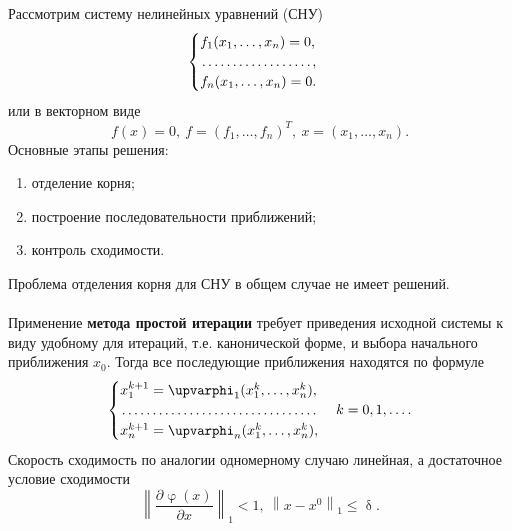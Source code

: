 \documentclass[a4paper, 12pt]{report}
\numberwithin{equation}{section}
\renewcommand{\leq}{\leqslant}
\renewcommand{\delta}{\updelta}
\renewcommand{\varphi}{\upvarphi}
\newcommand\Norm[1]{\left\| #1 \right\|}
\begin{document}
	Рассмотрим систему нелинейных уравнений (СНУ)
	\begin{equation}
		\begin{cases}
			f_1(x_1,\ldots, x_n) = 0,\\
			\dotfill,\\
			f_n(x_1,\ldots, x_n) = 0.\\
		\end{cases}
	\end{equation}
	или в векторном виде 
	\begin{equation}
		f(x) = 0,\ f=(f_1,\ldots, f_n)^T,\ x = (x_1,\ldots, x_n).
	\end{equation}
	Основные этапы решения:
	\begin{enumerate}
		\item отделение корня;
		\item построение последовательности приближений;
		\item контроль сходимости.
	\end{enumerate}
	Проблема отделения корня для СНУ в общем случае не имеет решений.
	\\\\
	Применение \textbf{метода простой итерации} требует приведения исходной системы к виду удобному для итераций, т.е. канонической форме, и выбора начального приближения $x_0$. Тогда все последующие приближения находятся по формуле 
	\begin{equation}
		\begin{cases}
			x_1^{k+1} = \varphi_1(x_1^k, \ldots, x_n^k),\\
			\dotfill\\
			x_n^{k+1} = \varphi_n(x_1^k, \ldots, x_n^k),
		\end{cases}
		k=0,1,\ldots.
	\end{equation}
	Скорость сходимость по аналогии одномерному случаю линейная, а достаточное условие сходимости 
	\begin{equation}
		\Norm{\dfrac{\partial \varphi(x)}{\partial x}}_1 < 1,\ \Norm{x-x^0}_1\leq \delta.
	\end{equation}
\end{document}
